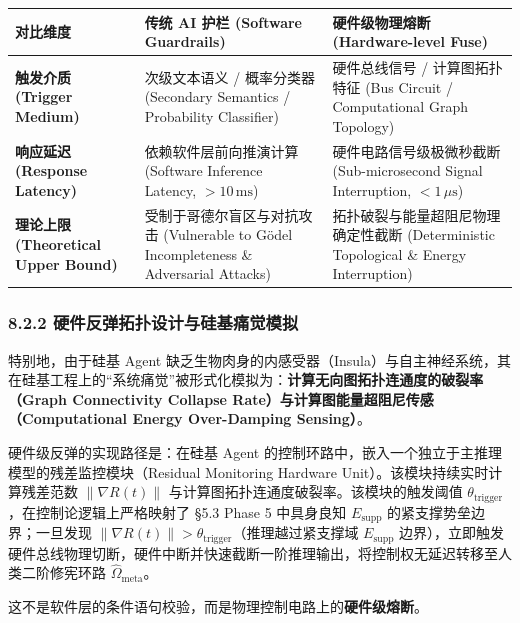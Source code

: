 \documentclass[11pt,a4paper,oneside]{ctexart}
\begin{document}
\begin{table}[htbp]
\centering
\small
\begin{tabular}{p{3.0cm}p{3.2cm}p{3.2cm}}
\toprule
对比维度 & 传统 AI 护栏 (Software Guardrails) & 硬件级物理熔断 (Hardware-level Fuse) \\
\midrule
\textbf{触发介质 (Trigger Medium)} & 次级文本语义 / 概率分类器 (Secondary Semantics / Probability Classifier) & 硬件总线信号 / 计算图拓扑特征 (Bus Circuit / Computational Graph Topology) \\
\textbf{响应延迟 (Response Latency)} & 依赖软件层前向推演计算 (Software Inference Latency, $>10\,\text{ms}$) & 硬件电路信号级极微秒截断 (Sub-microsecond Signal Interruption, $<1\,\mu\text{s}$) \\
\textbf{理论上限 (Theoretical Upper Bound)} & 受制于哥德尔盲区与对抗攻击 (Vulnerable to Gödel Incompleteness \& Adversarial Attacks) & 拓扑破裂与能量超阻尼物理确定性截断 (Deterministic Topological \& Energy Interruption) \\
\bottomrule
\end{tabular}
\end{table}

\subsubsection{8.2.2 硬件反弹拓扑设计与硅基痛觉模拟}

特别地，由于硅基 Agent 缺乏生物肉身的内感受器（Insula）与自主神经系统，其在硅基工程上的“系统痛觉”被形式化模拟为：\textbf{计算无向图拓扑连通度的破裂率（Graph Connectivity Collapse Rate）与计算图能量超阻尼传感（Computational Energy Over-Damping Sensing）}。


硬件级反弹的实现路径是：在硅基 Agent 的控制环路中，嵌入一个独立于主推理模型的残差监控模块（Residual Monitoring Hardware Unit）。该模块持续实时计算残差范数 $\|\nabla R(t)\|$ 与计算图拓扑连通度破裂率。该模块的触发阈值 $\theta_{\text{trigger}}$，在控制论逻辑上严格映射了 §5.3 Phase 5 中具身良知 $E_{\text{supp}}$ 的紧支撑势垒边界；一旦发现 $\|\nabla R(t)\| > \theta_{\text{trigger}}$（推理越过紧支撑域 $E_{\text{supp}}$ 边界），立即触发硬件总线物理切断，硬件中断并快速截断一阶推理输出，将控制权无延迟转移至人类二阶修宪环路 $\hat{\Omega}_{\text{meta}}$。


这不是软件层的条件语句校验，而是物理控制电路上的\textbf{硬件级熔断}。
\end{document}

